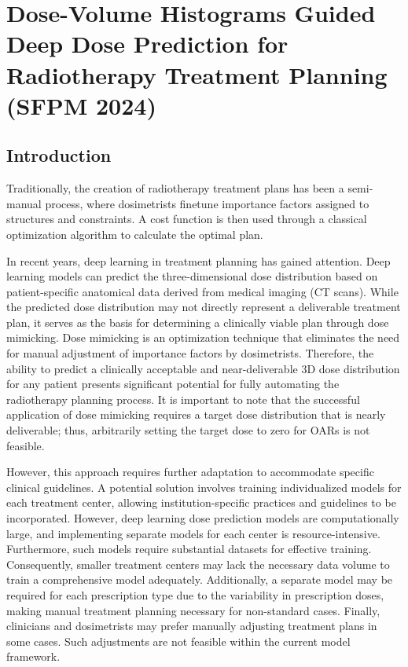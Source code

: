 \section[DVH Guided Deep Dose]{Dose-Volume Histograms Guided Deep Dose Prediction for Radiotherapy Treatment Planning (SFPM 2024)}
\subsection{Introduction}
Traditionally, the creation of radiotherapy treatment plans has been a semi-manual process, where dosimetrists finetune importance factors assigned to structures and constraints.
A cost function is then used through a classical optimization algorithm to calculate the optimal plan.

In recent years, deep learning in treatment planning has gained attention.
Deep learning models can predict the three-dimensional dose distribution based on patient-specific anatomical data derived from medical imaging (CT scans).
While the predicted dose distribution may not directly represent a deliverable treatment plan, it serves as the basis for determining a clinically viable plan through dose mimicking.
Dose mimicking is an optimization technique that eliminates the need for manual adjustment of importance factors by dosimetrists.
Therefore, the ability to predict a clinically acceptable and near-deliverable 3D dose distribution for any patient presents significant potential for fully automating the radiotherapy planning process.
It is important to note that the successful application of dose mimicking requires a target dose distribution that is nearly deliverable; thus, arbitrarily setting the target dose to zero for OARs is not feasible.

However, this approach requires further adaptation to accommodate specific clinical guidelines.
A potential solution involves training individualized models for each treatment center, allowing institution-specific practices and guidelines to be incorporated.
However, deep learning dose prediction models are computationally large, and implementing separate models for each center is resource-intensive.
Furthermore, such models require substantial datasets for effective training.
Consequently, smaller treatment centers may lack the necessary data volume to train a comprehensive model adequately.
Additionally, a separate model may be required for each prescription type due to the variability in prescription doses, making manual treatment planning necessary for non-standard cases.
Finally, clinicians and dosimetrists may prefer manually adjusting treatment plans in some cases.
Such adjustments are not feasible within the current model framework.

